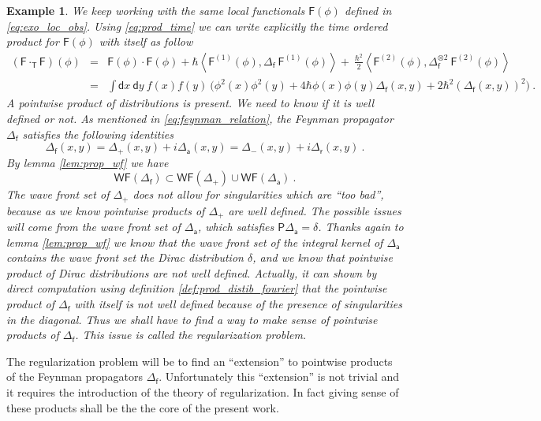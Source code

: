 \documentclass[11pt]{book}
\newcommand{\WF}{\mathsf{WF}}
\newcommand{\sm}[1]{\left\langle#1\right\rangle}
\newcommand{\Fsf}{\mathsf{F}}
\newcommand{\Psf}{\mathsf{P}}
\newcommand{\Tsf}{\mathsf{T}}
\newcommand{\asf}{\mathsf{a}}
\newcommand{\dsf}{\mathsf{d}}
\newcommand{\fsf}{\mathsf{f}}
\newcommand{\rsf}{\mathsf{r}}
\theoremstyle{break}
\newtheorem{example}{Example}[chapter]
\begin{document}
\begin{example}\label{exo:t_prod_loc_obs}
We keep working with the same local functionals $\Fsf(\phi)$ defined in \eqref{eq:exo_loc_obs}. Using \eqref{eq:prod_time} we can write explicitly the time ordered product for $\Fsf(\phi)$ with itself as follow
%
\begin{eqnarray*}
(\Fsf \cdot_\Tsf \Fsf)(\phi) &=& \Fsf(\phi) \cdot \Fsf(\phi) + \hbar \sm{ \Fsf^{(1)}(\phi) , \Delta_\fsf \ \Fsf^{(1)}(\phi) } + \ \frac{\hbar^2}{2} \sm{ \Fsf^{(2)}(\phi) , \Delta_\fsf^{\otimes 2} \ \Fsf^{(2)}(\phi)} \\
%
&=& \int \dsf x \ \dsf y \ f(x) f(y) \ \bigg( \phi^2(x) \phi^2(y) + 4 \hbar \phi(x) \phi(y) \Delta_\fsf(x,y) + 2 \hbar^2 \left(\Delta_\fsf(x,y)\right)^2 \bigg) \ .
\end{eqnarray*}
%
A pointwise product of distributions is present. We need to know if it is well defined or not. As mentioned in \eqref{eq:feynman_relation}, the Feynman propagator $\Delta_\fsf$ satisfies the following identities
%
\begin{equation}
\Delta_\fsf(x,y) = \Delta_+(x,y) + i \Delta_\asf(x,y) = \Delta_-(x,y) + i \Delta_\rsf(x,y) \ .
\label{eq:conv_feynman_prop}
\end{equation}
%
By lemma \ref{lem:prop_wf} we have
%
\begin{equation*}
\WF(\Delta_\fsf) \subset \WF(\Delta_+) \cup \WF(\Delta_\asf) \ .
\end{equation*}
%
The wave front set of $\Delta_+$ does not allow for  singularities which are ``too bad'', because as we know pointwise products of $\Delta_+$ are well defined. The possible issues will come from the wave front set of $\Delta_\asf$, which satisfies $\Psf \Delta_\asf = \delta$. Thanks again to lemma \ref{lem:prop_wf} we know that the wave front set of the integral kernel of $\Delta_\asf$ contains the wave front set the Dirac distribution $\delta$, and we know that pointwise product of Dirac distributions are not well defined. 
Actually, it can shown by direct computation using definition \ref{def:prod_distib_fourier} that the pointwise product of $\Delta_\fsf$ with itself is not well defined because of the presence of singularities in the diagonal. Thus we shall have to find a way to make sense of pointwise products of $\Delta_\fsf$. This issue is called the regularization problem.
\end{example}


The regularization problem will be to find an ``extension'' to pointwise products of the Feynman propagators $\Delta_\fsf$. Unfortunately this ``extension'' is not trivial and it requires the introduction of the theory of regularization. In fact giving sense of these products shall be the the core of the present work.
\end{document}
